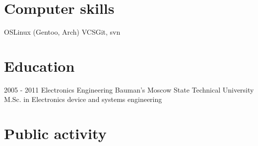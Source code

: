 \documentclass[11pt,a4paper]{moderncv}
\begin{document}
\section{Computer skills}
  \cvitem
  {OS}{Linux (Gentoo, Arch)}
  \cvitem
  {VCS}{Git, svn}

\section{Education}
  \cventry
    {2005 - 2011}
    {Electronics Engineering}
    {Bauman's Moscow State Technical University}
    {}{}
    {M.Sc. in Electronics device and systems engineering}

\section{Public activity}
\end{document}
